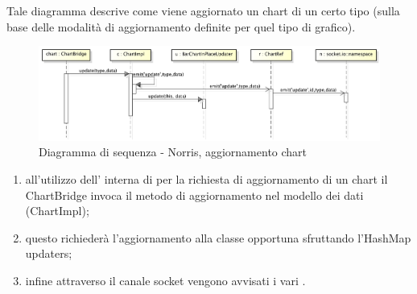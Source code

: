             Tale diagramma descrive come viene aggiornato un chart di un certo tipo (sulla base delle modalità di aggiornamento definite per quel tipo di grafico).
            \begin{figure}[H]
                \centering
                \includegraphics[scale=0.3]{DefinizioneDiProdotto/Pics/NorrisAggiornamentoChart}
                \caption{Diagramma di sequenza - Norris, aggiornamento chart}
            \end{figure}
            \begin{enumerate}
                \item all'utilizzo dell' interna di  per la richiesta di aggiornamento di un chart il ChartBridge invoca il metodo di aggiornamento nel modello dei dati (ChartImpl);
                \item questo richiederà l'aggiornamento alla classe opportuna sfruttando l'HashMap updaters;
                \item infine attraverso il canale socket vengono avvisati i vari .
            \end{enumerate}
